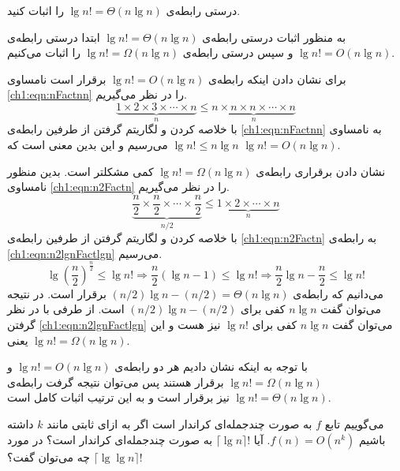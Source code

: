  درستی رابطه‌ی {$\lg n! = \Theta (n\lg n)$} را اثبات کنید.


به منظور اثبات درستی رابطه‌ی {$\lg n! = \Theta (n\lg n)$} ابتدا درستی رابطه‌ی {$\lg n! = O(n\lg n)$} و سپس درستی رابطه‌ی
{$\lg n! = \Omega (n\lg n)$} را اثبات می‌کنیم.

برای نشان دادن اینکه رابطه‌‌ی {$\lg n! = O(n\lg n)$} برقرار است نامساوی {\eqref{ch1:eqn:nFactnn}} را در نظر می‌گیریم.
\begin{equation}
\underbrace{1 \times 2 \times 3 \times \cdots \times n}_{n} \leq \underbrace{n \times n \times n \times \cdots \times n}_{n}\label{ch1:eqn:nFactnn}
\end{equation}
با خلاصه کردن و لگاریتم گرفتن از طرفین رابطه‌ی {\eqref{ch1:eqn:nFactnn}} به نامساوی {$\lg n! \leqslant n\lg n$} می‌رسیم و این بدین معنی است که {$\lg n! = O(n\lg n)$}. 

نشان دادن برقراری رابطه‌ی {$\lg n! = \Omega (n\lg n)$} کمی مشکلتر است. بدین منظور نامساوی {\eqref{ch1:eqn:n2Factn}} را در نظر می‌گیریم.
\begin{equation}
\underbrace{\frac{n}{2} \times \frac{n}{2} \times \cdots \times \frac{n}{2}}_{n/2} \leq \underbrace{1 \times 2 \times \cdots \times n}_{n}\label{ch1:eqn:n2Factn}
\end{equation}
با خلاصه کردن و لگاریتم گرفتن از طرفین رابطه‌ی {\eqref{ch1:eqn:n2Factn}} به رابطه‌ی {\eqref{ch1:eqn:n2lgnFactlgn}} می‌رسیم.
\begin{equation}
\lg {\left(\dfrac{n}{2}\right)}^\frac{n}{2} \leq \lg n! \Rightarrow \frac{n}{2}( \lg n - 1) \leq \lg n! \Rightarrow \frac{n}{2}\lg n - \frac{n}{2}\leq \lg n!\label{ch1:eqn:n2lgnFactlgn}
\end{equation}
می‌دانیم که رابطه‌ی {$(n/2)\lg n - (n/2)=\Theta (n \lg n)$} برقرار است. در نتیجه می‌توان گفت {$n\lg n$} کفی برای {$(n/2)\lg n - (n/2)$} است. از طرفی با در نظر گرفتن {\eqref{ch1:eqn:n2lgnFactlgn}} می‌توان گفت {$n\lg n$} کفی برای {$\lg n!$} نیز هست و این یعنی {$\lg n! = \Omega (n \lg n)$}.

با توجه به اینکه نشان دادیم هر دو رابطه‌ی {$\lg n! = O(n\lg n)$} و {$\lg n! = \Omega (n \lg n)$} برقرار هستند پس می‌توان نتیجه گرفت رابطه‌ی {$\lg n! = \Theta ( n\lg n)$} نیز برقرار است و به این ترتیب اثبات کامل است.

 می‌گوییم تابع {$f$} به صورت چندجمله‌ای کراندار است اگر به ازای ثابتی مانند {$k$} داشته باشیم {$f(n)=O(n^k)$}. آیا
 {$\lceil \lg n \rceil !$} به صورت چندجمله‌ای کراندار است؟ در مورد {$\lceil \lg \lg n \rceil !$} چه می‌توان گفت؟ 

